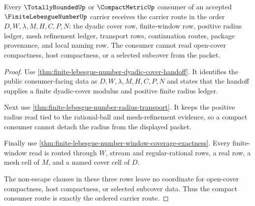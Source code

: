 \begin{theorem}
\label{thm:finite-lebesgue-number-compact-consumer-route}
Every $\TotallyBoundedUp$ or $\CompactMetricUp$ consumer of an accepted $\FiniteLebesgueNumberUp$ carrier receives the carrier route in the order $D,W,\lambda,M,H,C,P,N$: the dyadic cover row, finite-window row, positive radius ledger, mesh refinement ledger, transport rows, continuation routes, package provenance, and local naming row. The consumer cannot read open-cover compactness, host compactness, or a selected subcover from the packet.
\end{theorem}
\begin{proof}
Use \autoref{thm:finite-lebesgue-number-dyadic-cover-handoff}. It identifies the public consumer-facing data as $D,W,\lambda,M,H,C,P,N$ and states that the handoff supplies a finite dyadic-cover modulus and positive finite radius ledger.

Next use \autoref{thm:finite-lebesgue-number-radius-transport}. It keeps the positive radius read tied to the rational-ball and mesh-refinement evidence, so a compact consumer cannot detach the radius from the displayed packet.

Finally use \autoref{thm:finite-lebesgue-number-window-coverage-exactness}. Every finite-window read is routed through $W$, stream and regular-rational rows, a real row, a mesh cell of $M$, and a named cover cell of $D$.

The non-escape clauses in these three rows leave no coordinate for open-cover compactness, host compactness, or selected subcover data. Thus the compact consumer route is exactly the ordered carrier route.
\end{proof}

